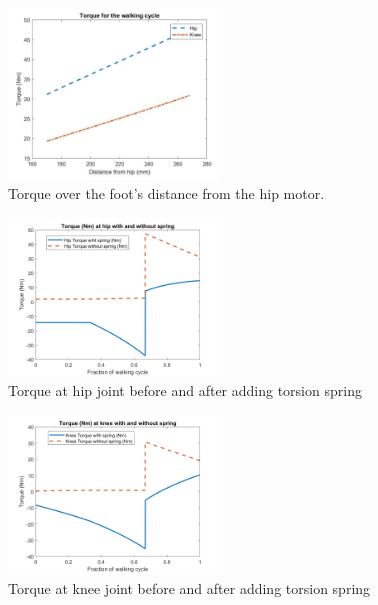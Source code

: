 \begin{figure}
    \centering
    \includegraphics[width=0.5\textwidth]{3_SystemModelling/img/Torque_Cycle.PNG}
    \caption{Torque over the foot's distance from the hip motor.}
    \label{fig:mod_torque_cycle}
\end{figure}

\begin{figure}
    \centering
    \includegraphics[width=0.5\textwidth]{3_SystemModelling/img/PowerHipComparison.png}
    \caption{Torque at hip joint before and after adding torsion spring}
    \label{fig:torque_comparison_hip}
\end{figure}{}

\begin{figure}
    \centering
    \includegraphics[width=0.5\textwidth]{3_SystemModelling/img/PowerKneeComparison.png}
    \caption{Torque at knee joint before and after adding torsion spring}
    \label{fig:torque_comparison_knee}
\end{figure}{}


